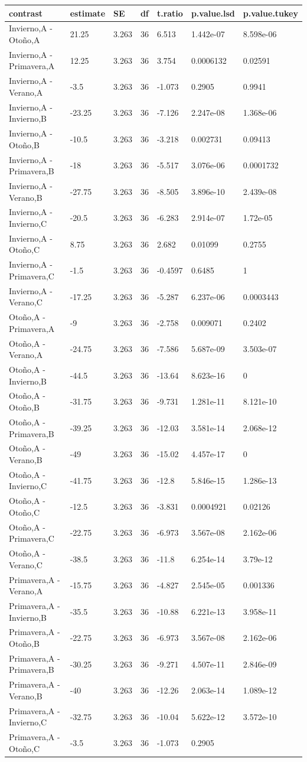 \documentclass[]{book}
\theoremstyle{definition}
\theoremstyle{definition}
\theoremstyle{definition}
\theoremstyle{remark}
\begin{document}
\begin{longtable}[]{@{}lllllll@{}}
\toprule
contrast & estimate & SE & df & t.ratio & p.value.lsd &
p.value.tukey\tabularnewline
\midrule
\endhead
Invierno,A - Otoño,A & 21.25 & 3.263 & 36 & 6.513 & 1.442e-07 &
8.598e-06\tabularnewline
Invierno,A - Primavera,A & 12.25 & 3.263 & 36 & 3.754 & 0.0006132 &
0.02591\tabularnewline
Invierno,A - Verano,A & -3.5 & 3.263 & 36 & -1.073 & 0.2905 &
0.9941\tabularnewline
Invierno,A - Invierno,B & -23.25 & 3.263 & 36 & -7.126 & 2.247e-08 &
1.368e-06\tabularnewline
Invierno,A - Otoño,B & -10.5 & 3.263 & 36 & -3.218 & 0.002731 &
0.09413\tabularnewline
Invierno,A - Primavera,B & -18 & 3.263 & 36 & -5.517 & 3.076e-06 &
0.0001732\tabularnewline
Invierno,A - Verano,B & -27.75 & 3.263 & 36 & -8.505 & 3.896e-10 &
2.439e-08\tabularnewline
Invierno,A - Invierno,C & -20.5 & 3.263 & 36 & -6.283 & 2.914e-07 &
1.72e-05\tabularnewline
Invierno,A - Otoño,C & 8.75 & 3.263 & 36 & 2.682 & 0.01099 &
0.2755\tabularnewline
Invierno,A - Primavera,C & -1.5 & 3.263 & 36 & -0.4597 & 0.6485 &
1\tabularnewline
Invierno,A - Verano,C & -17.25 & 3.263 & 36 & -5.287 & 6.237e-06 &
0.0003443\tabularnewline
Otoño,A - Primavera,A & -9 & 3.263 & 36 & -2.758 & 0.009071 &
0.2402\tabularnewline
Otoño,A - Verano,A & -24.75 & 3.263 & 36 & -7.586 & 5.687e-09 &
3.503e-07\tabularnewline
Otoño,A - Invierno,B & -44.5 & 3.263 & 36 & -13.64 & 8.623e-16 &
0\tabularnewline
Otoño,A - Otoño,B & -31.75 & 3.263 & 36 & -9.731 & 1.281e-11 &
8.121e-10\tabularnewline
Otoño,A - Primavera,B & -39.25 & 3.263 & 36 & -12.03 & 3.581e-14 &
2.068e-12\tabularnewline
Otoño,A - Verano,B & -49 & 3.263 & 36 & -15.02 & 4.457e-17 &
0\tabularnewline
Otoño,A - Invierno,C & -41.75 & 3.263 & 36 & -12.8 & 5.846e-15 &
1.286e-13\tabularnewline
Otoño,A - Otoño,C & -12.5 & 3.263 & 36 & -3.831 & 0.0004921 &
0.02126\tabularnewline
Otoño,A - Primavera,C & -22.75 & 3.263 & 36 & -6.973 & 3.567e-08 &
2.162e-06\tabularnewline
Otoño,A - Verano,C & -38.5 & 3.263 & 36 & -11.8 & 6.254e-14 &
3.79e-12\tabularnewline
Primavera,A - Verano,A & -15.75 & 3.263 & 36 & -4.827 & 2.545e-05 &
0.001336\tabularnewline
Primavera,A - Invierno,B & -35.5 & 3.263 & 36 & -10.88 & 6.221e-13 &
3.958e-11\tabularnewline
Primavera,A - Otoño,B & -22.75 & 3.263 & 36 & -6.973 & 3.567e-08 &
2.162e-06\tabularnewline
Primavera,A - Primavera,B & -30.25 & 3.263 & 36 & -9.271 & 4.507e-11 &
2.846e-09\tabularnewline
Primavera,A - Verano,B & -40 & 3.263 & 36 & -12.26 & 2.063e-14 &
1.089e-12\tabularnewline
Primavera,A - Invierno,C & -32.75 & 3.263 & 36 & -10.04 & 5.622e-12 &
3.572e-10\tabularnewline
Primavera,A - Otoño,C & -3.5 & 3.263 & 36 & -1.073 & 0.2905 &

\end{longtable}
\end{document}
